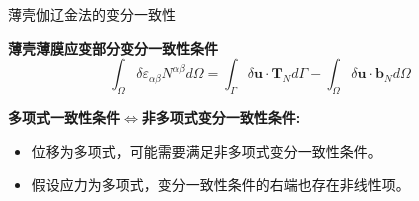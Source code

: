 \begin{frame}{薄壳伽辽金法的变分一致性}
\begin{tcolorbox}[colframe=MediumBlue, colback=white]
\begin{center}
    \end{center}
    \end{tcolorbox}

    \textbf{薄壳薄膜应变部分变分一致性条件}
    \begin{equation*}
        \int_\Omega \delta \varepsilon_{\alpha\beta} N^{\alpha\beta} d\Omega = \int_\Gamma \delta \boldsymbol u \cdot \boldsymbol T_N d\Gamma - \int_\Omega \delta \boldsymbol u \cdot \boldsymbol b_N d\Omega
    \end{equation*}
    \begin{tcolorbox}[colback=red!5, colframe=red!75!black,left=5pt,right=5pt, width=\textwidth]
    \textbf{多项式一致性条件$\Leftrightarrow$非多项式变分一致性条件:}
    \begin{itemize}
        \item 位移为多项式，可能需要满足非多项式变分一致性条件。
        \item 假设应力为多项式，变分一致性条件的右端也存在非线性项。
    \end{itemize}
    \end{tcolorbox}
\end{frame}

